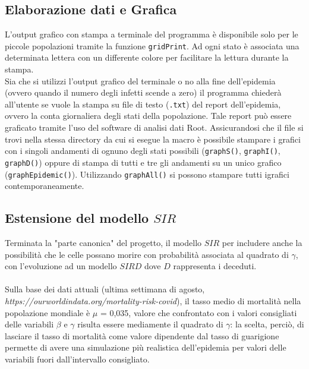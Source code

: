 \documentclass[a4paper]{article}
\begin{document}
\subsection{Elaborazione dati e Grafica}
L'output grafico con stampa a terminale del programma è disponibile solo per le piccole popolazioni tramite la funzione \texttt{gridPrint}. Ad ogni stato è associata una determinata lettera con un differente colore per facilitare la lettura durante la stampa. \\
Sia che si utilizzi l'output grafico del terminale o no alla fine dell'epidemia (ovvero quando il numero degli infetti scende a zero) il programma chiederà all'utente se vuole la stampa su file di testo (\texttt{.txt}) del report dell'epidemia, ovvero la conta giornaliera degli stati della popolazione. Tale report può essere graficato tramite l'uso del software di analisi dati Root. Assicurandosi che il file si trovi nella stessa directory da cui si esegue la macro è possibile stampare i grafici con i singoli andamenti di ognuno degli stati possibili (\texttt{graphS()}, \texttt{graphI()}, \texttt{graphD()}) oppure di stampa di tutti e tre gli andamenti su un unico grafico (\texttt{graphEpidemic()}). Utilizzando \texttt{graphAll()} si possono stampare tutti igrafici contemporaneamente.
\subsection{Estensione del modello $SIR$}
Terminata la "parte canonica" del progetto, il modello $SIR$ per includere anche la possibilità che le celle possano morire con probabilità associata al quadrato di $\gamma$, con l'evoluzione ad un modello $SIRD$ dove $D$ rappresenta i deceduti.\\ \\ Sulla base dei dati attuali (ultima settimana di agosto, \textit{https://ourworldindata.org/mortality-risk-covid}), il tasso medio di mortalità nella popolazione mondiale è $\mu$ = 0,035, valore che confrontato con i valori consigliati delle variabili $\beta$ e $\gamma$ risulta essere mediamente il quadrato di $\gamma$: la scelta, perciò, di lasciare il tasso di mortalità come valore dipendente dal tasso di guarigione permette di avere una simulazione più realistica dell'epidemia per valori delle variabili fuori dall'intervallo consigliato. 
\\ \\
\end{document}
